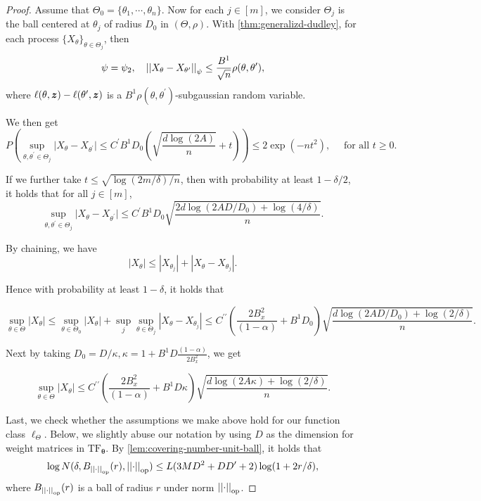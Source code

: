 \begin{proof}
Assume that $\Theta_0 = \{ \theta_1, \cdots, \theta_n\}$.
Now for each $j\in[m]$, we consider $\Theta_j$ is the ball centered at $\theta_j$ of radius $D_0$ in $(\Theta, \rho)$.
With \cref{thm:generalizd-dudley}, for each process $\{ X_{\theta} \}_{\theta \in\Theta_j}$, then
\[
\psi = \psi_2,
\quad
\left\lvert \left\lvert
X_{\theta}
-
X_{\theta^\prime}
\right\rvert \right\rvert_{\psi}
\leq
\frac{B^1}{\sqrt{n}}
\rho(\theta, \theta^\prime),
\]
where $\ell(\theta, \bm{z}) - \ell(\theta^\prime, \bm{z})$ is a $B^1 \rho(\theta, \theta^\prime)$-subgaussian random variable.

We then get
\[
P
\left(
    \sup_{\theta, \theta^\prime \in \Theta_j}
    \vert 
    X_{\theta}
    -
    X_{\theta^\prime}
    \vert 
    \leq
    C^\prime 
    B^1
    D_0
    \left(
    \sqrt{
    \frac{d\log(2A)}{n}
    }
    +t
    \right)
\right)
\leq
2 \exp( -nt^2),
\quad\text{ for all }t \geq 0.
\]

If we further take $t \leq \sqrt{\log(2m/\delta)/n}$, then with probability at least $1 - \delta/2$, it holds that for all $j\in[m]$,
\[
    \sup_{\theta, \theta^\prime \in \Theta_j}
    \vert 
    X_{\theta}
    -
    X_{\theta^\prime}
    \vert 
    \leq
    C^\prime
    B^1
    D_0
    \sqrt{
    \frac{
    2d \log (2AD/D_0) + \log(4/\delta)
    }{n}
    }.
\]

By chaining, we have
\[
|X_{\theta}|
\leq 
|X_{\theta_j}|
+
|X_{\theta}
-
X_{\theta_j}|.
\]

Hence with probability at least $1 - \delta$, it holds that

\[
\sup_{\theta\in\Theta}
|X_{\theta}|
\leq
\sup_{\theta\in\Theta_0} | X_{\theta} |
+
\sup_j
\sup_{\theta \in \Theta_j}
| X_{\theta} - X_{\theta_j} |
\leq 
C^{\prime\prime}
(
\frac{2 B_x^2}{(1 - \alpha)}
+
B^1 D_0
)
\sqrt{
\frac{
d \log (2AD/D_0) + \log(2/\delta)
}{n}
}.
\]

Next by taking $D_0 = D/\kappa, \kappa= 1 + B^1D \frac{(1 - \alpha)}{2 B_x^2}$, we get

\[
\sup_{\theta\in\Theta}
|X_{\theta}|
\leq
C^{\prime\prime}
(
\frac{2 B_x^2}{(1 - \alpha)}
+
B^1 D \kappa
)
\sqrt{
\frac{
d \log (2A \kappa) + \log(2/\delta)
}{n}
}.
\]

Last, we check whether the assumptions we make above hold for our function class $\ell_\Theta$. 
Below, we slightly abuse our notation by using $D$ as the dimension for weight matrices in $\text{TF}_{\bm{\theta}}$.
By \cref{lem:covering-number-unit-ball}, it holds that 
\[
\log N (\delta, B_{\left\lvert \left\lvert\cdot\right\rvert \right\rvert_{\text{op}}}(r), \left\lvert \left\lvert\cdot\right\rvert \right\rvert_{\text{op}} )
\leq
L(3MD^2 + D D^\prime + 2) \log ( 1 + 2r/\delta),
\]
where $B_{\left\lvert \left\lvert\cdot\right\rvert \right\rvert_{\text{op}}}(r)$ is a ball of radius $r$ under norm $\left\lvert \left\lvert\cdot\right\rvert \right\rvert_{\text{op}}$.


\end{proof}
